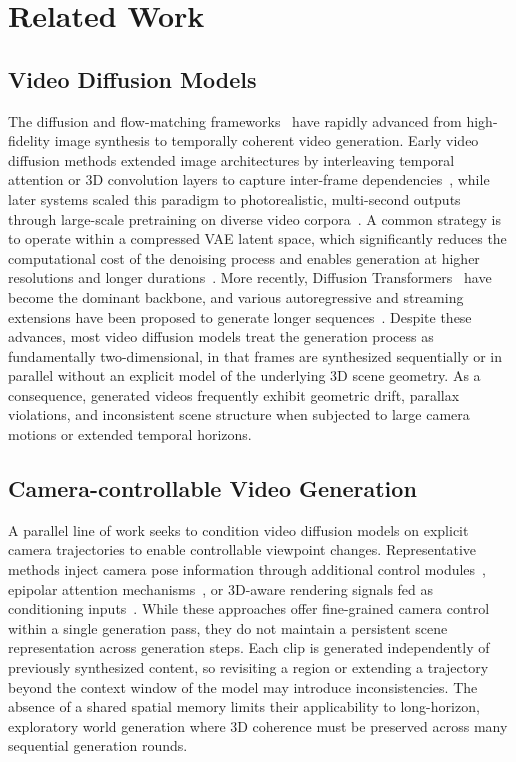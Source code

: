 \section{Related Work}

\subsection{Video Diffusion Models}
The diffusion and flow-matching frameworks~\cite{lipman2022flow,esser2024scaling} have rapidly advanced from high-fidelity image synthesis to temporally coherent video generation. Early video diffusion methods extended image architectures by interleaving temporal attention or 3D convolution layers to capture inter-frame dependencies~\cite{blattmann2023stable,guo2023animatediff,chen2024videocrafter2}, while later systems scaled this paradigm to photorealistic, multi-second outputs through large-scale pretraining on diverse video corpora~\cite{sora,kong2024hunyuanvideo,yang2024cogvideox,xu2024easyanimate,allegro2024,fan2025vchitect}. A common strategy is to operate within a compressed VAE latent space, which significantly reduces the computational cost of the denoising process and enables generation at higher resolutions and longer durations~\cite{blattmann2023stable,hacohen2024ltx,wan2025wan}. More recently, Diffusion Transformers~\cite{peebles2023scalable} have become the dominant backbone, and various autoregressive and streaming extensions have been proposed to generate longer sequences~\cite{chen2024diffusion,henschel2024streamingt2v,gu2025long,chen2025skyreels,xie2024progressive}. Despite these advances, most video diffusion models treat the generation process as fundamentally two-dimensional, in that frames are synthesized sequentially or in parallel without an explicit model of the underlying 3D scene geometry. As a consequence, generated videos frequently exhibit geometric drift, parallax violations, and inconsistent scene structure when subjected to large camera motions or extended temporal horizons.

\subsection{Camera-controllable Video Generation}
A parallel line of work seeks to condition video diffusion models on explicit camera trajectories to enable controllable viewpoint changes. Representative methods inject camera pose information through additional control modules~\cite{he2024cameractrl,he2025cameractrl,feng2024i2vcontrol,zhang2026panflow}, epipolar attention mechanisms~\cite{yu2024viewcrafter,zhou2025stable}, or 3D-aware rendering signals fed as conditioning inputs~\cite{gu2025das,ren2025gen3c,yang2025omnicam}. While these approaches offer fine-grained camera control within a single generation pass, they do not maintain a persistent scene representation across generation steps. Each clip is generated independently of previously synthesized content, so revisiting a region or extending a trajectory beyond the context window of the model may introduce inconsistencies. The absence of a shared spatial memory limits their applicability to long-horizon, exploratory world generation where 3D coherence must be preserved across many sequential generation rounds.

